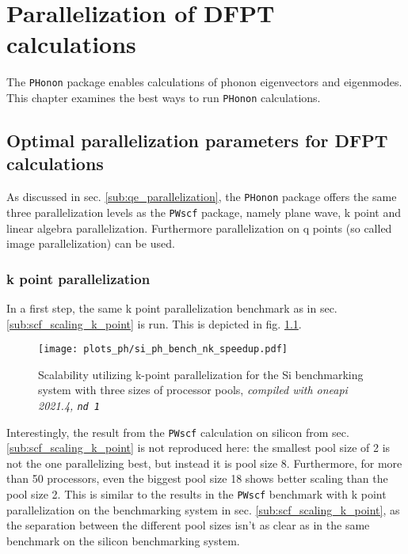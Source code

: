 \documentclass[main.tex]{subfiles}
\begin{document}
\chapter{Parallelization of DFPT calculations}\label{ch:optimization_ph}

The \texttt{PHonon} package enables calculations of phonon eigenvectors and eigenmodes.
This chapter examines the best ways to run \texttt{PHonon} calculations.

\section{Optimal parallelization parameters for DFPT calculations}

As discussed in sec. \ref{sub:qe_parallelization}, the \texttt{PHonon} package offers the same three parallelization levels as the \texttt{PWscf} package, namely plane wave, k point and linear algebra parallelization.
Furthermore parallelization on q points (so called image parallelization) can be used.

\subsection{k point parallelization}

In a first step, the same k point parallelization benchmark as in sec. \ref{sub:scf_scaling_k_point} is run. This is depicted in fig. \ref{fig:scaling_ph_nk_si}.

\begin{figure}[h!]
    \centering
    \texttt{[image: plots\_ph/si\_ph\_bench\_nk\_speedup.pdf]}
    \caption{Scalability utilizing k-point parallelization for the Si benchmarking system with three sizes of processor pools, \emph{\QE compiled with \gls{oneapi} 2021.4, \texttt{nd 1}}}
    \label{fig:scaling_ph_nk_si}
\end{figure}
Interestingly, the result from the \texttt{PWscf} calculation on silicon from sec. \ref{sub:scf_scaling_k_point} is not reproduced here: the smallest pool size of 2 is not the one parallelizing best, but instead it is pool size 8.
Furthermore, for more than 50 processors, even the biggest pool size 18 shows better scaling than the pool size 2.
This is similar to the results in the \texttt{PWscf} benchmark with k point parallelization on the \TaS benchmarking system in sec. \ref{sub:scf_scaling_k_point}, as the separation between the different pool sizes isn't as clear as in the same benchmark on the silicon benchmarking system.
\end{document}
